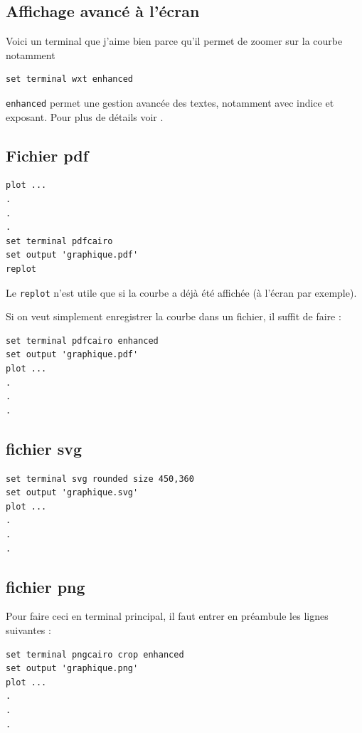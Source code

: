 \documentclass[a4paper,twoside]{article}
\begin{document}
\subsection{Affichage avancé à l'écran}
Voici un terminal que j'aime bien parce qu'il permet de zoomer sur la courbe notamment

\begin{verbatim}
set terminal wxt enhanced
\end{verbatim}

\begin{remarque}
\texttt{enhanced} permet une gestion avancée des textes, notamment avec indice et exposant. Pour plus de détails voir .
\end{remarque}


\subsection{Fichier pdf}
\begin{verbatim}
plot ...
.
.
.
set terminal pdfcairo
set output 'graphique.pdf'
replot
\end{verbatim}

\begin{remarque}
Le \texttt{replot} n'est utile que si la courbe a déjà été affichée (à l'écran par exemple).
\end{remarque}

Si on veut simplement enregistrer la courbe dans un fichier, il suffit de faire : 
\begin{verbatim}
set terminal pdfcairo enhanced
set output 'graphique.pdf'
plot ...
.
.
.
\end{verbatim}

\subsection{fichier svg}
\begin{verbatim}
set terminal svg rounded size 450,360
set output 'graphique.svg'
plot ...
.
.
.
\end{verbatim}

\subsection{fichier png}
Pour faire ceci en terminal principal, il faut entrer en préambule les lignes suivantes :
\begin{verbatim}
set terminal pngcairo crop enhanced
set output 'graphique.png'
plot ...
.
.
.
\end{verbatim}
\end{document}
